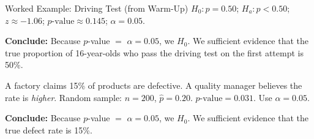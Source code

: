 \documentclass[10pt]{article}
\begin{document}
\begin{notesbox}{Worked Example: Driving Test (from Warm-Up)}
$H_0: p=0.50$; $H_a: p<0.50$; $z\approx-1.06$; $p\text{-value}\approx0.145$; $\alpha=0.05$.

\textbf{Conclude:} Because $p$-value $=$ \blank{1.5cm} \blank{1cm} $\alpha = 0.05$, we
\blank{3cm} $H_0$. We \blank{3cm} sufficient evidence that the true proportion of 16-year-olds
who pass the driving test on the first attempt is \blank{4cm} 50\%.
\end{notesbox}

\begin{practicebox}
A factory claims 15\% of products are defective. A quality manager believes the rate is
\emph{higher}. Random sample: $n=200$, $\hat p=0.20$. $p\text{-value}=0.031$.
Use $\alpha=0.05$.

\textbf{Conclude:} Because $p$-value $=$ \blank{1.5cm} \blank{1cm} $\alpha = 0.05$, we
\blank{3cm} $H_0$. We \blank{3cm} sufficient evidence that the true defect rate is
\blank{4cm} 15\%.
\end{practicebox}
\end{document}
